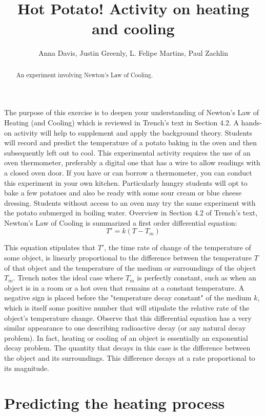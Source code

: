 \documentclass{ximera}
\title{Hot Potato! Activity on heating and cooling}
\author{Anna Davis, Justin Greenly, L. Felipe Martins, Paul Zachlin}
\begin{document}
 
\begin{abstract}
An experiment involving Newton's Law of Cooling.
\end{abstract}
 
\maketitle
 
The purpose of this exercise is to deepen your understanding of Newton's Law of Heating (and Cooling) which is reviewed in Trench's text in Section 4.2.  A hands-on activity will help to supplement and apply the background theory.  Students will record and predict the temperature of a potato baking in the oven and then subsequently left out to cool.  This experimental activity requires the use of an oven thermometer, preferably a digital one that has a wire to allow readings with a closed oven door.  If you have or can borrow a thermometer, you can conduct this experiment in your own kitchen.  Particularly hungry students will opt to bake a few potatoes and also be ready with some sour cream or blue cheese dressing.  Students without access to an oven may try the same experiment with the potato submerged in boiling water.
Overview
in Section 4.2 of Trench's text, Newton's Law of Cooling is summarized a first order differential equation:
\[
T'=k(T-T_m)
\]
  
This equation stipulates that $T'$, the time rate of change of the temperature of some object, is linearly proportional to the difference between the temperature  $T$ of that object and the temperature of the medium or surroundings of the object $T_m$.  Trench notes the ideal case where  $T_m$ is perfectly constant, such as when an object is in a room or a hot oven that remains at a constant temperature.  A negative sign is placed before the "temperature decay constant" of the medium $k$, which is itself some positive number that will stipulate the relative rate of the object's temperature change.  Observe that this differential equation has a very similar appearance to one describing radioactive decay (or any natural decay problem).  In fact, heating or cooling of an object is essentially an exponential decay problem.  The quantity that decays in this case is the difference between the object and its surroundings.  This difference decays at a rate proportional to its magnitude.
  
\section*{Predicting the heating process}
 
\end{document}
